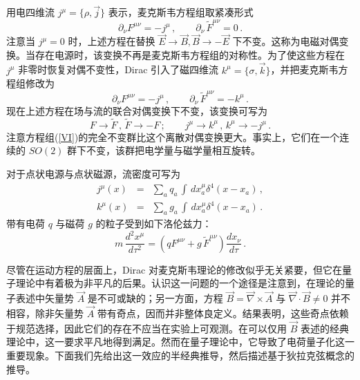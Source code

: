 用电四维流 $j^{\mu}=\{\rho,\vec{j}\}$ 表示，麦克斯韦方程组取紧凑形式
\begin{equation}
\partial_\nu F^{\mu\nu}=-j^\mu\,,\qquad\partial_\nu\,\widetilde
F^{\mu\nu}=0\,. \label{V}
\end{equation}
注意当 $j^\mu =0$ 时，上述方程在替换 $\vec{E} \rightarrow \vec{B}, \vec{B} \rightarrow
-\vec{E}$ 下不变。这称为电磁对偶变换。当存在电源时，该变换不再是麦克斯韦方程组的对称性。为了使这些方程在 $j^{\mu}$ 非零时恢复对偶不变性，Dirac \cite{Dirac} 引入了磁四维流 $k^{\mu}=\{\sigma ,\vec{k}\}$，并把麦克斯韦方程组修改为
\begin{equation}
\partial_\nu F^{\mu\nu}=-j^\mu\,,\qquad\partial_\nu\,
\widetilde F^{\mu\nu}= -k^\mu \,.   
\label{VI}
\end{equation}
现在上述方程在场与流的联合对偶变换下不变，该变换可写为
\begin{equation}
F\rightarrow \widetilde F\,,\,\widetilde F\rightarrow-F\,;\qquad 
j^\mu\rightarrow k^\mu\,,\, k^\mu\rightarrow -j^\mu\,.
\label{emduality}
\end{equation}
注意方程组(\ref{VI})的完全不变群比这个离散对偶变换更大。事实上，它们在一个连续的 $SO(2)$ 群下不变，该群把电学量与磁学量相互旋转。


对于点状电源与点状磁源，流密度可写为
\begin{eqnarray}
j^{\mu}(x) & = & \sum_{a} q_{a} \, \int \, dx_{a}^{\mu}
\delta^{4} (x - x_{a})\,, \nonumber \\
k^{\mu}(x) & = & \sum_{a} g_{a} \, \int \, dx_{a}^{\mu}
\delta^{4} (x - x_{a})\,.\nonumber
\end{eqnarray}
带有电荷 $q$ 与磁荷 $g$ 的粒子受到如下洛伦兹力：
$$
m\,\frac{d^2x^\mu}{d\tau^2}=(q F^{\mu\nu}+g\, \widetilde F^{\mu\nu})
\frac{dx_\nu}{d\tau}\,.
$$

尽管在运动方程的层面上，Dirac 对麦克斯韦理论的修改似乎无关紧要，但它在量子理论中有着极为非平凡的后果。认识这一问题的一个途径是注意到，在理论的量子表述中矢量势 $\vec{A}$ 是不可或缺的；另一方面，方程
$\vec{B}=\vec{\nabla}\times \vec{A}$ 与 $\vec{\nabla}\cdot\vec{B}\ne
0$ 并不相容，除非矢量势 $\vec{A}$ 带有奇点，因而并非整体良定义。结果表明，这些奇点依赖于规范选择，因此它们的存在不应当在实验上可观测。在可以仅用 $\vec B$ 表述的经典理论中，这一要求平凡地得到满足。然而在量子理论中，它导致了电荷量子化这一重要现象。下面我们先给出这一效应的半经典推导，然后描述基于狄拉克弦概念的推导。
 
